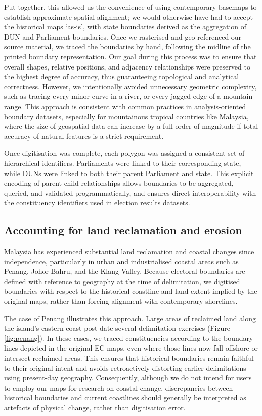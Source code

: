 \documentclass[11pt]{article}
\begin{document}
Put together, this allowed us the convenience of using contemporary basemaps to establish approximate spatial alignment; we would otherwise have had to accept the historical maps `as-is', with state boundaries derived as the aggregation of DUN and Parliament boundaries.
Once we rasterised and geo-referenced our source material, we traced the boundaries by hand, following the midline of the printed boundary representation. Our goal during this process was to ensure that overall shapes, relative positions, and adjacency relationships were preserved to the highest degree of accuracy, thus guaranteeing topological and analytical correctness. However, we intentionally avoided unnecessary geometric complexity, such as tracing every minor curve in a river, or every jagged edge of a mountain range. This approach is consistent with common practices in analysis-oriented boundary datasets, especially for mountainous tropical countries like Malaysia, where the size of geospatial data can increase by a full order of magnitude if total accuracy of natural features is a strict requirement.

Once digitisation was complete, each polygon was assigned a consistent set of hierarchical identifiers. Parliaments were linked to their corresponding state, while DUNs were linked to both their parent Parliament and state. This explicit encoding of parent-child relationships allows boundaries to be aggregated, queried, and validated programmatically, and ensures direct interoperability with the constituency identifiers used in election results datasets.


\subsection*{Accounting for land reclamation and erosion}

Malaysia has experienced substantial land reclamation and coastal changes since independence, particularly in urban and industrialised coastal areas such as Penang, Johor Bahru, and the Klang Valley. Because electoral boundaries are defined with reference to geography at the time of delimitation, we digitised boundaries with respect to the historical coastline and land extent implied by the original maps, rather than forcing alignment with contemporary shorelines.

The case of Penang illustrates this approach. Large areas of reclaimed land along the island's eastern coast post-date several delimitation exercises (Figure \ref{fig:penang}). In these cases, we traced constituencies according to the boundary lines depicted in the original EC maps, even where those lines now fall offshore or intersect reclaimed areas. This ensures that historical boundaries remain faithful to their original intent and avoids retroactively distorting earlier delimitations using present-day geography. Consequently, although we do not intend for users to employ our maps for research on coastal change, discrepancies between historical boundaries and current coastlines should generally be interpreted as artefacts of physical change, rather than digitisation error.
\end{document}
